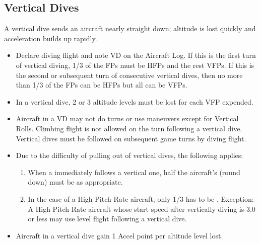 \subsection{Vertical Dives}
\label{rule:vertical-dives}

A vertical dive sends an aircraft nearly straight down; altitude is lost quickly and acceleration builds up rapidly.

\begin{itemize}


    \item{} Declare diving flight and note VD on the Aircraft Log. If this is the first turn of vertical diving, 1/3 of the FPs must be HFPs and the rest VFPs. If this is the second or subsequent turn of consecutive vertical dives, then no more than 1/3 of the FPs can be HFPs but all can be VFPs.

    \item{} In a vertical dive, 2 or 3 altitude levels must be lost for each VFP expended.

    \item{} Aircraft in a VD may not do turns or use maneuvers except for Vertical Rolls. Climbing flight is not allowed on the turn following a vertical dive. Vertical dives must be followed on subsequent game turns by diving flight.

    \item{} Due to the difficulty of pulling out of vertical dives, the following applies:
        \begin{enumerate}
        \item[a)] When a  immediately follows a vertical one, half the aircraft's  (round down) must be  as appropriate.
    \item[b)]  In the case of a High Pitch Rate aircraft, only 1/3 has to be . Exception: A High Pitch Rate aircraft whose start speed after vertically diving is 3.0 or less may use level flight following a vertical dive. 
\end{enumerate}

\item{} Aircraft in a vertical dive gain 1 Accel point per altitude level lost.

\end{itemize}

